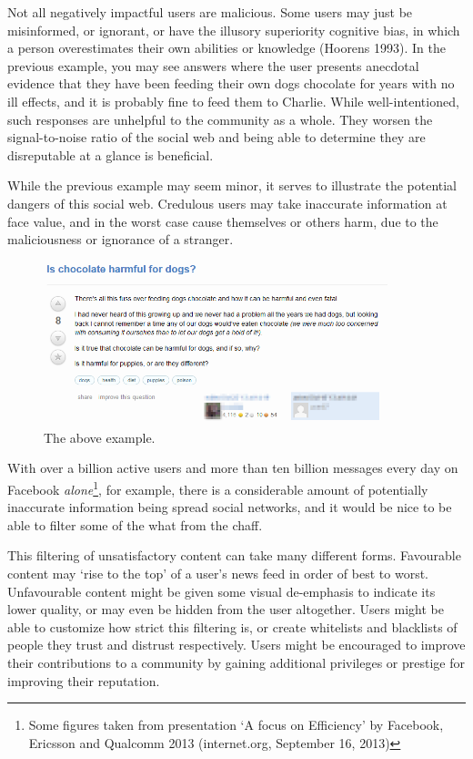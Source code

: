 \documentclass[]{final_report}
\begin{document}
Not all negatively impactful users are malicious. Some users may just be misinformed, or ignorant, or have the illusory superiority cognitive bias, in which a person overestimates their own abilities or knowledge (Hoorens 1993). In the previous example, you may see answers where the user presents anecdotal evidence that they have been feeding their own dogs chocolate for years with no ill effects, and it is probably fine to feed them to Charlie. While well-intentioned, such responses are unhelpful to the community as a whole. They worsen the signal-to-noise ratio of the social web and being able to determine they are disreputable at a glance is beneficial.

While the previous example may seem minor, it serves to illustrate the potential dangers of this social web. Credulous users may take inaccurate information at face value, and in the worst case cause themselves or others harm, due to the maliciousness or ignorance of a stranger.

\begin{figure}[ht!]
\centering
\includegraphics[width=100mm]{dog.PNG}
\caption{The above example.}
\end{figure}

With over a billion active users and more than ten billion messages every day on Facebook \textsl{alone}\footnote{Some figures taken from presentation `A focus on Efficiency' by Facebook, Ericsson and Qualcomm 2013 (internet.org, September 16, 2013)}, for example, there is a considerable amount of potentially inaccurate information being spread social networks, and it would be nice to be able to filter some of the what from the chaff.

This filtering of unsatisfactory content can take many different forms. Favourable content may `rise to the top' of a user's news feed in order of best to worst. Unfavourable content might be given some visual de-emphasis to indicate its lower quality, or may even be hidden from the user altogether. Users might be able to customize how strict this filtering is, or create whitelists and blacklists of people they trust and distrust respectively. Users might be encouraged to improve their contributions to a community by gaining additional privileges or prestige for improving their reputation.
\end{document}
